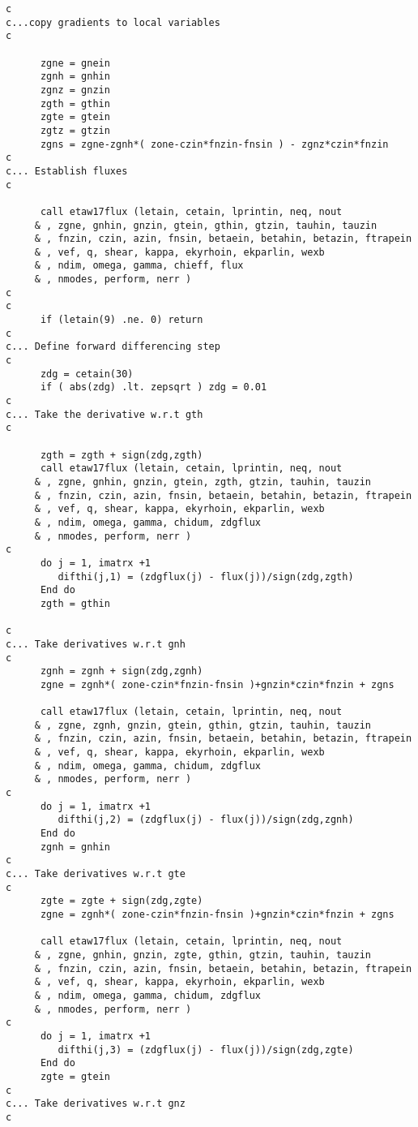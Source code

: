 \begin{verbatim}
c
c...copy gradients to local variables
c

      zgne = gnein
      zgnh = gnhin
      zgnz = gnzin
      zgth = gthin
      zgte = gtein
      zgtz = gtzin
      zgns = zgne-zgnh*( zone-czin*fnzin-fnsin ) - zgnz*czin*fnzin
c
c... Establish fluxes
c

      call etaw17flux (letain, cetain, lprintin, neq, nout
     & , zgne, gnhin, gnzin, gtein, gthin, gtzin, tauhin, tauzin
     & , fnzin, czin, azin, fnsin, betaein, betahin, betazin, ftrapein
     & , vef, q, shear, kappa, ekyrhoin, ekparlin, wexb
     & , ndim, omega, gamma, chieff, flux
     & , nmodes, perform, nerr )
c
c
      if (letain(9) .ne. 0) return
c
c... Define forward differencing step
c
      zdg = cetain(30)
      if ( abs(zdg) .lt. zepsqrt ) zdg = 0.01
c
c... Take the derivative w.r.t gth
c

      zgth = zgth + sign(zdg,zgth)
      call etaw17flux (letain, cetain, lprintin, neq, nout
     & , zgne, gnhin, gnzin, gtein, zgth, gtzin, tauhin, tauzin
     & , fnzin, czin, azin, fnsin, betaein, betahin, betazin, ftrapein
     & , vef, q, shear, kappa, ekyrhoin, ekparlin, wexb
     & , ndim, omega, gamma, chidum, zdgflux
     & , nmodes, perform, nerr )
c
      do j = 1, imatrx +1 
         difthi(j,1) = (zdgflux(j) - flux(j))/sign(zdg,zgth)
      End do
      zgth = gthin

c
c... Take derivatives w.r.t gnh
c
      zgnh = zgnh + sign(zdg,zgnh)
      zgne = zgnh*( zone-czin*fnzin-fnsin )+gnzin*czin*fnzin + zgns

      call etaw17flux (letain, cetain, lprintin, neq, nout
     & , zgne, zgnh, gnzin, gtein, gthin, gtzin, tauhin, tauzin
     & , fnzin, czin, azin, fnsin, betaein, betahin, betazin, ftrapein
     & , vef, q, shear, kappa, ekyrhoin, ekparlin, wexb
     & , ndim, omega, gamma, chidum, zdgflux
     & , nmodes, perform, nerr )
c
      do j = 1, imatrx +1
         difthi(j,2) = (zdgflux(j) - flux(j))/sign(zdg,zgnh)
      End do
      zgnh = gnhin
c
c... Take derivatives w.r.t gte
c
      zgte = zgte + sign(zdg,zgte)
      zgne = zgnh*( zone-czin*fnzin-fnsin )+gnzin*czin*fnzin + zgns

      call etaw17flux (letain, cetain, lprintin, neq, nout
     & , zgne, gnhin, gnzin, zgte, gthin, gtzin, tauhin, tauzin
     & , fnzin, czin, azin, fnsin, betaein, betahin, betazin, ftrapein
     & , vef, q, shear, kappa, ekyrhoin, ekparlin, wexb
     & , ndim, omega, gamma, chidum, zdgflux
     & , nmodes, perform, nerr )
c
      do j = 1, imatrx +1
         difthi(j,3) = (zdgflux(j) - flux(j))/sign(zdg,zgte)
      End do
      zgte = gtein
c
c... Take derivatives w.r.t gnz
c


\end{verbatim}

